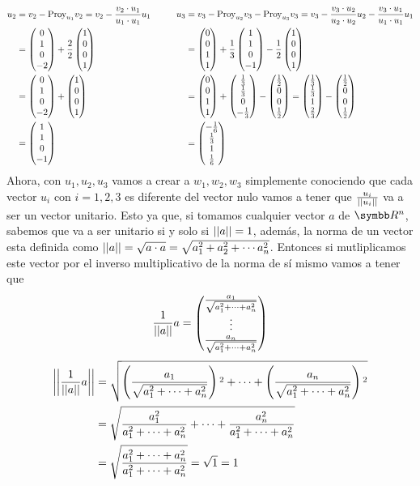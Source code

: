     \[
        \begin{aligned}
            u_2 &= v_2 - \fproy{u_1}{v_2} 
                = v_2 - \frac{v_2 \cdot u_1}{u_1 \cdot u_1}u_1 \\
            &= \fvec{0,1,0,-2} + \frac{2}{2}\fvec{1,0,0,1} \\
            &= \fvec{0,1,0,-2} + \fvec{1,0,0,1} \\
            &= \fvec{1,1,0,-1} \\
        \end{aligned}
        \hspace{1cm}
        \begin{aligned}
            u_3 &= v_3 - \fproy{u_2}{v_3} - \fproy{u_3}{v_3}
                = v_3 -\frac{v_3 \cdot u_2}{u_2 \cdot u_2}u_2 - \frac{v_3 \cdot u_1}{u_1 \cdot u_1}u_1 \\
            &= \fvec{0,0,1,1} +\frac{1}{3}\fvec{1,1,0,-1} -\frac{1}{2}\fvec{1,0,0,1}\\
            &= \fvec{0,0,1,1} +\fvec{\frac{1}{3},\frac{1}{3},0,-\frac{1}{3}} -\fvec{\frac{1}{2},0,0,\frac{1}{2}}
                = \fvec{\frac{1}{3},\frac{1}{3},1,\frac{2}{3}} - \fvec{\frac{1}{2},0,0,\frac{1}{2}} \\
            &= \fvec{-\frac{1}{6},\frac{1}{3},1,\frac{1}{6}}
        \end{aligned}
    \]
    Ahora, con \(u_1, u_2, u_3\) vamos a crear a \(w_1, w_2, w_3\) simplemente conociendo que cada vector \(u_i\) con \(i = 1, 2, 3\) es diferente del vector nulo
    vamos a tener que \(\frac{u_i}{\left|\left|u_i\right|\right|}\) va a ser un vector unitario. 
    Esto ya que, si tomamos cualquier vector \(a\) de \(\realR^n\), sabemos que va a ser unitario si y solo si \(\left|\left|a\right|\right| = 1\), 
    además, la norma de un vector esta definida como \(\left|\left|a\right|\right| = \sqrt{a \cdot a} = \sqrt{a_1^2 + a_2^2 + \cdots a_n^2}\). 
    Entonces si mutliplicamos este vector por el inverso multiplicativo de la norma de sí mismo vamos a tener que
    \[
        \frac{1}{\fnorm{a}}a = 
        \fvec{
            \frac{a_1}{\sqrt{a_1^2 + \cdots + a_n^2}},
            \vdots,
            \frac{a_n}{\sqrt{a_1^2 + \cdots + a_n^2}}
        }
    \]
    \[
        \begin{aligned}
            \left|\left|\frac{1}{\left|\left|a\right|\right|}a\right|\right| 
            &= 
            \sqrt{
                \left(
                    \frac{a_1}{\sqrt{a_1^2 + \cdots + a_n^2}}
                \right){}^2
                +
                \cdots
                +
                \left(
                    \frac{a_n}{\sqrt{a_1^2 + \cdots + a_n^2}}
                \right){}^2
            }\\
            &=
            \sqrt{
                \frac{a_1^2}{a_1^2 + \cdots + a_n^2}
                +
                \cdots
                +
                \frac{a_n^2}{a_1^2 + \cdots + a_n^2}
            }\\
            &=
            \sqrt{\frac{a_1^2 + \cdots + a_n^2}{a_1^2 + \cdots + a_n^2}}
                = \sqrt{1} 
                = 1
        \end{aligned}
    \]

